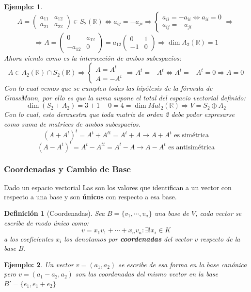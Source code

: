 \documentclass[10pt,a4paper,openright]{book}
\theoremstyle{break}
\newtheorem*{defi}{Definición}
\newtheorem*{ej}{\underline{Ejemplo}:}
\begin{document}
\begin{ej}
$$A=\left(\begin{array}{cc}a_{11}&a_{12}\\ a_{21}&a_{22}\end{array}\right)\in S_2(\mathbb R)\Leftrightarrow a_{ij}=-a_{ji}\Rightarrow
\begin{cases}
a_{ii}=-a_{ii}\Leftrightarrow a_{ii}=0 \\
a_{ij}=-a_{ji}
\end{cases}\Rightarrow$$
$$\Rightarrow A=\left(\begin{array}{cc}0&a_{12}\\ -a_{12}&0\end{array}\right)=a_{12}\left(\begin{array}{cc}0&1\\ -1&0\end{array}\right)\Rightarrow \dim A_2(\mathbb R)=1$$
Ahora viendo como es la intersección de ambos subespacios:
$$A\in A_2(\mathbb R)\cap S_2(\mathbb R)\Rightarrow \begin{cases}
A=A^t \\ A=-A^t \end{cases} \Rightarrow A^t=-A^t\Leftrightarrow A^t=-A^t=0\Rightarrow A = 0$$
Con lo cual vemos que se cumplen todas las hipótesis de la fórmula de GrassMann, por ello es que la suma supone el total del espacio vectorial definido:
$$\dim (S_2+A_2)=3+1-0=4=\dim Mat_2(\mathbb R)\Rightarrow V=S_2\oplus A_2$$
Con lo cual, esto demuestra que toda matriz de orden 2 debe poder expresarse como suma de matrices de ambos subespacios.
$$(A+A^t)^t=A^t+A^{tt}=A^t+A\rightarrow A+A^t\mbox{ es simétrica}$$
$$(A-A^t)^t=A^t-A^{tt}=A^t-A\rightarrow A-A^t\mbox{ es antisimétrica}$$
\end{ej}

\subsubsection{Coordenadas y Cambio de Base}
Dado un espacio vectorial Las son los valores que identifican a un vector con respecto a una base y son \textbf{únicos} con respecto a esa base.

\begin{defi}[Coordenadas]
Sea $B=\{v_1,\cdots,v_n\}$ una base de $V$, cada vector se escribe de modo único como:
$$v=x_1v_1+\cdots+x_nv_n: \exists! x_i\in K$$
a los coeficientes $x_i$ los denotamos por \textbf{coordenadas} del vector $v$ respecto de la base $B$.
\end{defi}

\begin{ej}
Un vector $v=(a_1,a_2)$ se escribe de esa forma en la base canónica pero $v=(a_1-a_2, a_2)$ son las coordenadas del mismo vector en la base $B'=\{e_1, e_1+e_2\}$
\end{ej}
\end{document}

